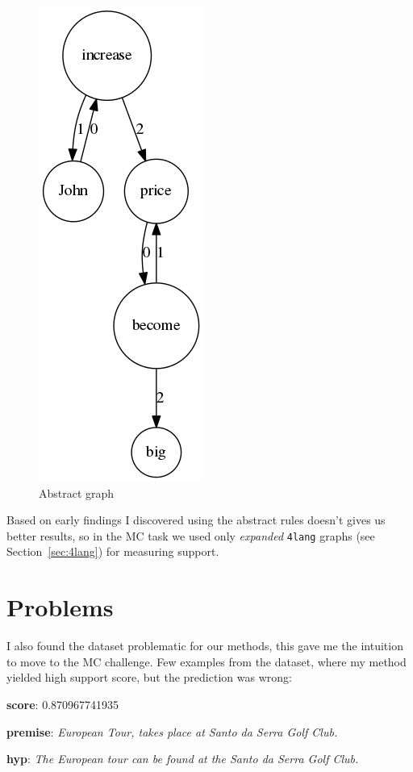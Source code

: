 \begin{figure}
	\centering
	\includegraphics[scale=0.5]{figures/thirdrule3}
	\caption{Abstract graph}
	\label{fig:thirdrule3}
\end{figure}

Based on early findings I discovered using the abstract rules doesn't gives us better results, so in the MC task we used only \textit{expanded} \texttt{4lang} graphs (see
Section~\ref{sec:4lang}) for measuring support. 

\section{Problems}
I also found the dataset problematic for our methods, this gave me the intuition to move to the MC challenge. Few examples from the dataset, where my method yielded high support score, but the prediction was wrong:

\textbf{score}: 0.870967741935

\textbf{premise}: \textit{European Tour, takes place at Santo da Serra Golf Club.}

\textbf{hyp}: \textit{The European tour can be found at the Santo da Serra Golf Club.}
\linebreak

